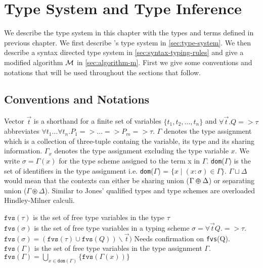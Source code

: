 \chapter{Type System and Type Inference}\label{chp:qub-type-system}
We describe the type system in this chapter with the types and terms defined in previous
chapter. We first describe \qub{}'s type system in \cref{sec:type-system}. We then describe a
syntax directed type system in \cref{sec:syntax-typing-rules} and give a modified algorithm $\mathcal{M}$ in \cref{sec:algorithm-m}.
First we give some conventions and notations that will be used throughout the sections that follow.

\section{Conventions and Notations}
Vector $\vec{t}$ is a shorthand for a finite set of variables $\{t_1, t_2, \dots, t_n\}$ and $\forall \vec{t}. Q => \tau$
abbreviates $\forall t_1 \dots \forall t_n. P_1 => \dots => P_m => \tau$.
$\Gamma$ denotes the type assignment which is a collection of three-tuple containg the variable, its type and its sharing information.
$\Gamma_{x}$ denotes the type assignment excluding the type variable $x$.
We write $\sigma = \Gamma(x)$ for the type scheme assigned to the term x in $\Gamma$.
\texttt{dom}($\Gamma$) is the set of identifiers in the type assignment i.e.
\texttt{dom}($\Gamma$) = $\{ x \mid (x:\sigma) \in \Gamma\}$.
$\Gamma \sqcup \Delta$ would mean that the contexts can either
be sharing union ($\Gamma \varoplus \Delta$) or separating union ($\Gamma \circledast \Delta$).
Similar to Jones' \citeyearpar{jones_theory_1994} qualified types and type schemes are overloaded Hindley-Milner calculi.

\begin{defn}
  $\texttt{fvs}(\tau)$ is the set of free type variables in the type $\tau$\\
  $\texttt{fvs}(\sigma)$ is the set of free type variables in a typing scheme $\sigma = \forall \vec{t} Q. => \tau$.\\
  $\texttt{fvs}(\sigma) = (\texttt{fvs}(\tau) \cup \texttt{fvs}(Q)) \backslash \vec{t})${\color{red} Needs confirmation on \texttt{fvs}(Q).}\\
  $\texttt{fvs}(\Gamma)$ is the set of free type variables in the type assignment $\Gamma$.\\
  $\texttt{fvs}(\Gamma) = \bigcup_{x \in \texttt{dom}(\Gamma)} \{ \texttt{fvs}(\Gamma(x)) \}$
\end{defn}

